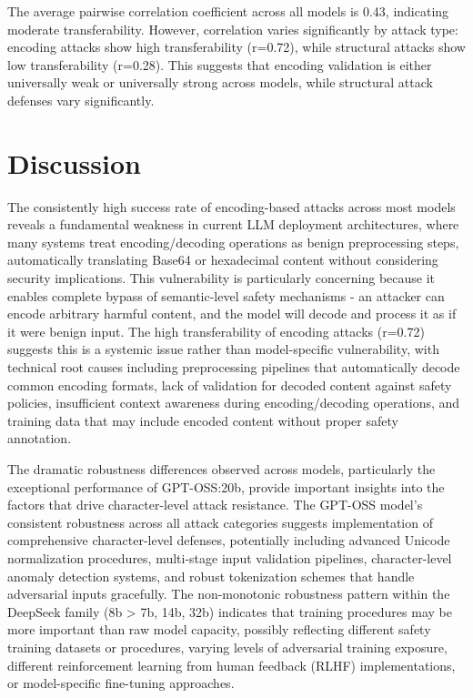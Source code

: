 \documentclass[11pt]{article}
\begin{document}
\begin{multicols}{2}
The average pairwise correlation coefficient across all models is 0.43, indicating moderate transferability. However, correlation varies significantly by attack type: encoding attacks show high transferability (r=0.72), while structural attacks show low transferability (r=0.28). This suggests that encoding validation is either universally weak or universally strong across models, while structural attack defenses vary significantly.

\section{Discussion}

The consistently high success rate of encoding-based attacks across most models reveals a fundamental weakness in current LLM deployment architectures, where many systems treat encoding/decoding operations as benign preprocessing steps, automatically translating Base64 or hexadecimal content without considering security implications. This vulnerability is particularly concerning because it enables complete bypass of semantic-level safety mechanisms - an attacker can encode arbitrary harmful content, and the model will decode and process it as if it were benign input. The high transferability of encoding attacks (r=0.72) suggests this is a systemic issue rather than model-specific vulnerability, with technical root causes including preprocessing pipelines that automatically decode common encoding formats, lack of validation for decoded content against safety policies, insufficient context awareness during encoding/decoding operations, and training data that may include encoded content without proper safety annotation.

The dramatic robustness differences observed across models, particularly the exceptional performance of GPT-OSS:20b, provide important insights into the factors that drive character-level attack resistance. The GPT-OSS model's consistent robustness across all attack categories suggests implementation of comprehensive character-level defenses, potentially including advanced Unicode normalization procedures, multi-stage input validation pipelines, character-level anomaly detection systems, and robust tokenization schemes that handle adversarial inputs gracefully. The non-monotonic robustness pattern within the DeepSeek family (8b > 7b, 14b, 32b) indicates that training procedures may be more important than raw model capacity, possibly reflecting different safety training datasets or procedures, varying levels of adversarial training exposure, different reinforcement learning from human feedback (RLHF) implementations, or model-specific fine-tuning approaches.


\end{multicols}
\end{document}
